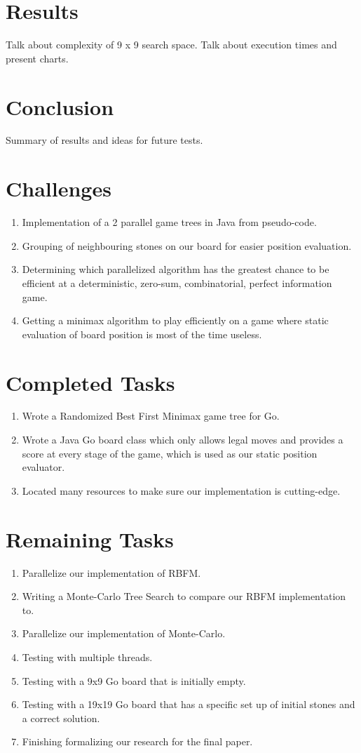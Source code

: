 \documentclass[conference]{IEEEtran}
\begin{document}
\section{Results}
Talk about complexity of 9 x 9 search space.
Talk about execution times and present charts.

\section{Conclusion}
Summary of results and ideas for future tests.

\appendices
\section{Challenges}
\begin{enumerate}
  \item Implementation of a 2 parallel game trees in Java from pseudo-code.
  \item Grouping of neighbouring stones on our board for easier position evaluation.
  \item Determining which parallelized algorithm has the greatest chance to be efficient at a deterministic, zero-sum, combinatorial, perfect information game.
  \item Getting a minimax algorithm to play efficiently on a game where static evaluation of board position is most of the time useless.
\end{enumerate}

\section{Completed Tasks}
\begin{enumerate}
  \item Wrote a Randomized Best First Minimax game tree for Go.
  \item Wrote a Java Go board class which only allows legal moves and provides a score at every stage of the game, which is used as our static position evaluator.
  \item Located many resources to make sure our implementation is cutting-edge.
\end{enumerate}

\section{Remaining Tasks}
\begin{enumerate}
  \item Parallelize our implementation of RBFM.
  \item Writing a Monte-Carlo Tree Search to compare our RBFM implementation to.
  \item Parallelize our implementation of Monte-Carlo.
  \item Testing with multiple threads.
  \item Testing with a 9x9 Go board that is initially empty.
  \item Testing with a 19x19 Go board that has a specific  set up of initial stones and a correct solution.
  \item Finishing formalizing our research for the final paper.
\end{enumerate}
\end{document}
